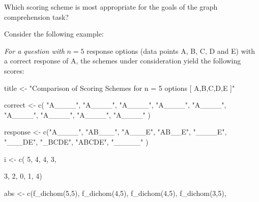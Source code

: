 \documentclass[
  letterpaper,
  DIV=11,
  numbers=noendperiod]{scrreprt}
\newenvironment{Shaded}{\begin{snugshade}}{\end{snugshade}}
\newcommand{\DecValTok}[1]{\textcolor[rgb]{0.68,0.00,0.00}{#1}}
\newcommand{\FunctionTok}[1]{\textcolor[rgb]{0.28,0.35,0.67}{#1}}
\newcommand{\NormalTok}[1]{\textcolor[rgb]{0.00,0.23,0.31}{#1}}
\newcommand{\OtherTok}[1]{\textcolor[rgb]{0.00,0.23,0.31}{#1}}
\newcommand{\StringTok}[1]{\textcolor[rgb]{0.13,0.47,0.30}{#1}}
\begin{document}
Which scoring scheme is most appropriate for the goals of the graph
comprehension task?

Consider the following example:

\emph{For a question with} \(n = 5\) response options (data points A, B,
C, D and E) with a correct response of A, the schemes under
consideration yield the following scores:

\begin{Shaded}
\begin{Highlighting}[]
\NormalTok{title }\OtherTok{\textless{}{-}} \StringTok{"Comparison of Scoring Schemes for n = 5 options [ A,B,C,D,E ]"}

\NormalTok{correct }\OtherTok{\textless{}{-}} \FunctionTok{c}\NormalTok{( }\StringTok{"A\_\_\_\_"}\NormalTok{,  }
              \StringTok{"A\_\_\_\_"}\NormalTok{,      }
              \StringTok{"A\_\_\_\_"}\NormalTok{,        }
              \StringTok{"A\_\_\_\_"}\NormalTok{,        }
              \StringTok{"A\_\_\_\_"}\NormalTok{,      }
              \StringTok{"A\_\_\_\_"}\NormalTok{,      }
              \StringTok{"A\_\_\_\_"}\NormalTok{,      }
              \StringTok{"A\_\_\_\_"}\NormalTok{,      }
              \StringTok{"A\_\_\_\_"}\NormalTok{ ) }

\NormalTok{response }\OtherTok{\textless{}{-}} \FunctionTok{c}\NormalTok{(}\StringTok{"A\_\_\_\_"}\NormalTok{,  }
              \StringTok{"AB\_\_\_"}\NormalTok{,      }
              \StringTok{"A\_\_\_E"}\NormalTok{,      }
              \StringTok{"AB\_\_E"}\NormalTok{,        }
              \StringTok{"\_\_\_\_E"}\NormalTok{,}
              \StringTok{"\_\_\_DE"}\NormalTok{,}
              \StringTok{"\_BCDE"}\NormalTok{,      }
              \StringTok{"ABCDE"}\NormalTok{,      }
              \StringTok{"\_\_\_\_\_"}\NormalTok{ )}

\NormalTok{i }\OtherTok{\textless{}{-}} \FunctionTok{c}\NormalTok{(        }\DecValTok{5}\NormalTok{,       }
               \DecValTok{4}\NormalTok{,              }
               \DecValTok{4}\NormalTok{,              }
               \DecValTok{3}\NormalTok{,               }
               
               \DecValTok{3}\NormalTok{,}
               \DecValTok{2}\NormalTok{,}
               \DecValTok{0}\NormalTok{,}
               \DecValTok{1}\NormalTok{,}
               \DecValTok{4}\NormalTok{)}

\NormalTok{abs }\OtherTok{\textless{}{-}} \FunctionTok{c}\NormalTok{(}\FunctionTok{f\_dichom}\NormalTok{(}\DecValTok{5}\NormalTok{,}\DecValTok{5}\NormalTok{), }
         \FunctionTok{f\_dichom}\NormalTok{(}\DecValTok{4}\NormalTok{,}\DecValTok{5}\NormalTok{), }
         \FunctionTok{f\_dichom}\NormalTok{(}\DecValTok{4}\NormalTok{,}\DecValTok{5}\NormalTok{), }
         \FunctionTok{f\_dichom}\NormalTok{(}\DecValTok{3}\NormalTok{,}\DecValTok{5}\NormalTok{), }
         

\end{Highlighting}
\end{Shaded}
\end{document}
